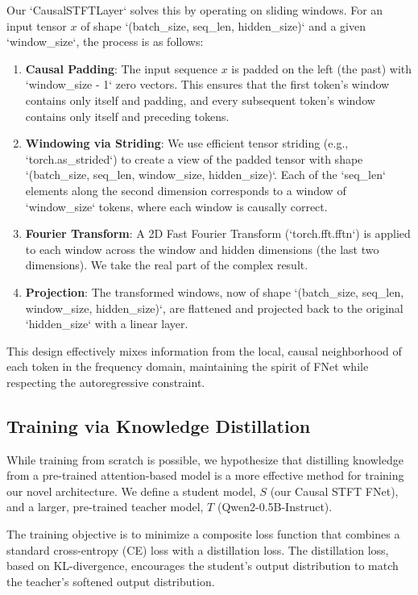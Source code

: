 \documentclass[11pt,a4paper]{article}
\begin{document}
Our `CausalSTFTLayer` solves this by operating on sliding windows. For an input tensor $x$ of shape `(batch_size, seq_len, hidden_size)` and a given `window_size`, the process is as follows:
\begin{enumerate}
    \item \textbf{Causal Padding}: The input sequence $x$ is padded on the left (the past) with `window_size - 1` zero vectors. This ensures that the first token's window contains only itself and padding, and every subsequent token's window contains only itself and preceding tokens.
    \item \textbf{Windowing via Striding}: We use efficient tensor striding (e.g., `torch.as_strided`) to create a view of the padded tensor with shape `(batch_size, seq_len, window_size, hidden_size)`. Each of the `seq_len` elements along the second dimension corresponds to a window of `window_size` tokens, where each window is causally correct.
    \item \textbf{Fourier Transform}: A 2D Fast Fourier Transform (`torch.fft.fftn`) is applied to each window across the window and hidden dimensions (the last two dimensions). We take the real part of the complex result.
    \item \textbf{Projection}: The transformed windows, now of shape `(batch_size, seq_len, window_size, hidden_size)`, are flattened and projected back to the original `hidden_size` with a linear layer.
\end{enumerate}
This design effectively mixes information from the local, causal neighborhood of each token in the frequency domain, maintaining the spirit of FNet while respecting the autoregressive constraint.

\subsection{Training via Knowledge Distillation}
While training from scratch is possible, we hypothesize that distilling knowledge from a pre-trained attention-based model is a more effective method for training our novel architecture. We define a student model, $S$ (our Causal STFT FNet), and a larger, pre-trained teacher model, $T$ (Qwen2-0.5B-Instruct).

The training objective is to minimize a composite loss function that combines a standard cross-entropy (CE) loss with a distillation loss. The distillation loss, based on KL-divergence, encourages the student's output distribution to match the teacher's softened output distribution.
\end{document}
